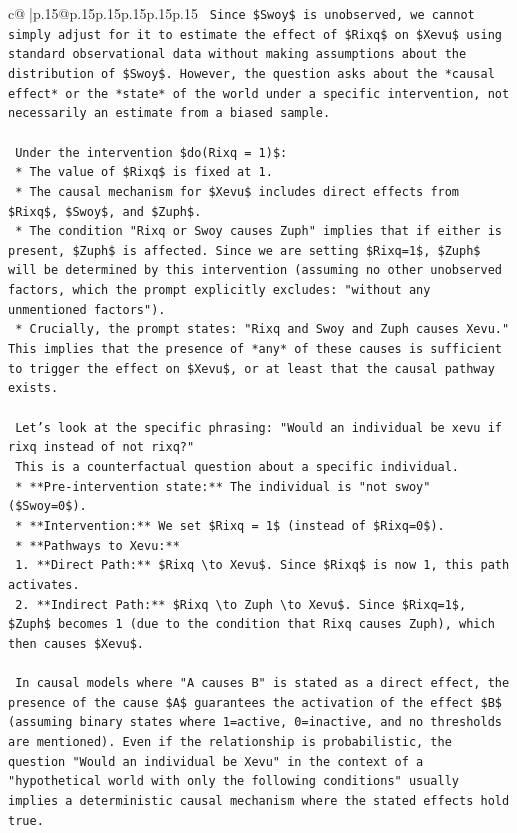 \documentclass{article}
\begin{document}
{\begin{supertabular}{c@{$\;$}|p{.15\linewidth}@{}p{.15\linewidth}p{.15\linewidth}p{.15\linewidth}p{.15\linewidth}p{.15\linewidth}}
{{{\texttt{    Since \$Swoy\$ is unobserved, we cannot simply adjust for it to estimate the effect of \$Rixq\$ on \$Xevu\$ using standard observational data without making assumptions about the distribution of \$Swoy\$. However, the question asks about the *causal effect* or the *state* of the world under a specific intervention, not necessarily an estimate from a biased sample.} \\
\\ 
\texttt{    Under the intervention \$do(Rixq = 1)\$:} \\
\texttt{    *   The value of \$Rixq\$ is fixed at 1.} \\
\texttt{    *   The causal mechanism for \$Xevu\$ includes direct effects from \$Rixq\$, \$Swoy\$, and \$Zuph\$.} \\
\texttt{    *   The condition "Rixq or Swoy causes Zuph" implies that if either is present, \$Zuph\$ is affected. Since we are setting \$Rixq=1\$, \$Zuph\$ will be determined by this intervention (assuming no other unobserved factors, which the prompt explicitly excludes: "without any unmentioned factors").} \\
\texttt{    *   Crucially, the prompt states: "Rixq and Swoy and Zuph causes Xevu." This implies that the presence of *any* of these causes is sufficient to trigger the effect on \$Xevu\$, or at least that the causal pathway exists.} \\
\\ 
\texttt{    Let's look at the specific phrasing: "Would an individual be xevu if rixq instead of not rixq?"} \\
\texttt{    This is a counterfactual question about a specific individual.} \\
\texttt{    *   **Pre{-}intervention state:** The individual is "not swoy" (\$Swoy=0\$).} \\
\texttt{    *   **Intervention:** We set \$Rixq = 1\$ (instead of \$Rixq=0\$).} \\
\texttt{    *   **Pathways to Xevu:**} \\
\texttt{        1.  **Direct Path:** \$Rixq \textbackslash{}to Xevu\$. Since \$Rixq\$ is now 1, this path activates.} \\
\texttt{        2.  **Indirect Path:** \$Rixq \textbackslash{}to Zuph \textbackslash{}to Xevu\$. Since \$Rixq=1\$, \$Zuph\$ becomes 1 (due to the condition that Rixq causes Zuph), which then causes \$Xevu\$.} \\
\\ 
\texttt{    In causal models where "A causes B" is stated as a direct effect, the presence of the cause \$A\$ guarantees the activation of the effect \$B\$ (assuming binary states where 1=active, 0=inactive, and no thresholds are mentioned). Even if the relationship is probabilistic, the question "Would an individual be Xevu" in the context of a "hypothetical world with only the following conditions" usually implies a deterministic causal mechanism where the stated effects hold true.} \\
}}}
\end{supertabular}}
\end{document}
